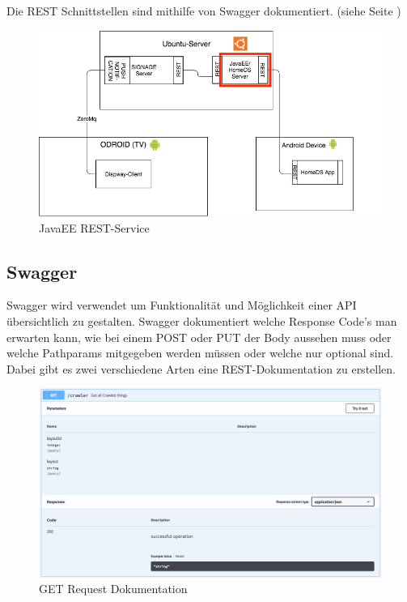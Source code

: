 Die REST Schnittstellen sind mithilfe von Swagger dokumentiert. (siehe Seite \pageref{sec:javaeeandroidrestswagger})

\begin{figure}[H]
\centering
\includegraphics[width=1\textwidth]{images/08_HomeDsWeb/rest.png}
\caption{JavaEE REST-Service}
\label{img:crawler}
\end{figure}

\subsection{Swagger}\label{sec:javaeeandroidrestswagger}
Swagger wird verwendet um Funktionalität und Möglichkeit einer API übersichtlich zu gestalten. Swagger dokumentiert welche Response Code's man erwarten kann, wie bei einem POST oder PUT der Body aussehen muss oder welche Pathparams mitgegeben werden müssen oder welche nur optional sind. Dabei gibt es zwei verschiedene Arten eine REST-Dokumentation zu erstellen.

\begin{figure}[H]
\centering
\includegraphics[width=1\textwidth]{images/08_HomeDsWeb/swaggerget.png}
\caption{GET Request Dokumentation}
\label{img:swaggerdoku}
\end{figure}

